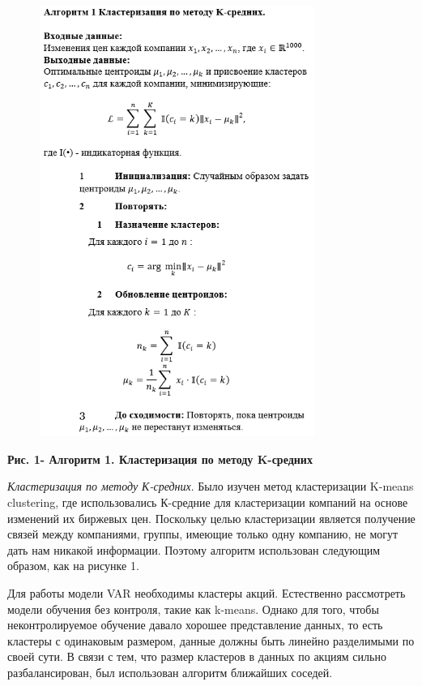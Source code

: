 {\begin{figure}[H]
	\centering
	\includegraphics[width=0.8\textwidth]{media/ict2/image3}
	\caption*{}
\end{figure}


{\bfseries Рис. 1- Алгоритм 1. Кластеризация по методу K-средних}

\emph{Кластеризация по методу К-средних}. Было изучен метод
кластеризации K-means clustering, где использовались К-средние для
кластеризации компаний на основе изменений их биржевых цен. Поскольку
целью кластеризации является получение связей между компаниями, группы,
имеющие только одну компанию, не могут дать нам никакой информации.
Поэтому алгоритм использован следующим образом, как на рисунке 1.

Для работы модели VAR необходимы кластеры акций. Естественно рассмотреть
модели обучения без контроля, такие как k-means. Однако для того, чтобы
неконтролируемое обучение давало хорошее представление данных, то есть
кластеры с одинаковым размером, данные должны быть линейно разделимыми
по своей сути. В связи с тем, что размер кластеров в данных по акциям
сильно разбалансирован, был использован алгоритм ближайших соседей.

}
